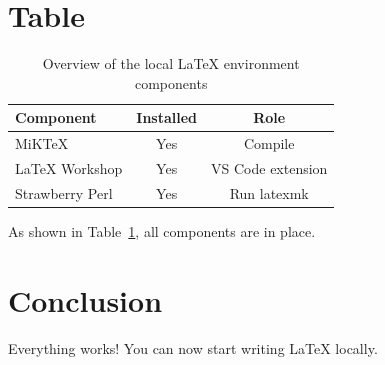 \documentclass[11pt]{article}
\begin{document}
\section{Table}
\begin{table}[h]
    \centering
    \begin{tabular}{lcc}
        \hline
        Component & Installed & Role \\
        \hline
        MiKTeX          & Yes & Compile \\
        LaTeX Workshop  & Yes & VS Code extension \\
        Strawberry Perl & Yes & Run latexmk \\
        \hline
    \end{tabular}
    \caption{Overview of the local \LaTeX{} environment components}
    \label{tab:components}
\end{table}

As shown in Table~\ref{tab:components}, all components are in place.

\section{Conclusion}
Everything works! You can now start writing \LaTeX{} locally.
\end{document}
